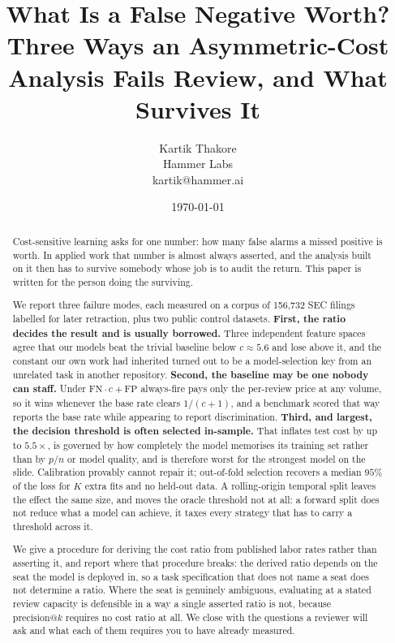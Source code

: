 \documentclass[11pt]{article}
\title{\bfseries What Is a False Negative Worth?\\[2pt]
\large Three Ways an Asymmetric-Cost Analysis Fails Review, and What Survives It}
\author{Kartik Thakore\\\small Hammer Labs\\\small kartik@hammer.ai}
\date{\today}
\begin{document}
\maketitle

\begin{abstract}
\noindent
Cost-sensitive learning asks for one number: how many false alarms a missed positive is worth.
In applied work that number is almost always asserted, and the analysis built on it then has to
survive somebody whose job is to audit the return. This paper is written for the person doing
the surviving.

We report three failure modes, each measured on a corpus of 156{,}732 SEC filings labelled for
later retraction, plus two public control datasets. \textbf{First, the ratio decides the
result and is usually borrowed.} Three independent feature spaces agree that our models beat
the trivial baseline below $c \approx 5.6$ and lose above it, and the constant our own work had
inherited turned out to be a model-selection key from an unrelated task in another repository.
\textbf{Second, the baseline may be one nobody can staff.} Under $\mathrm{FN}\cdot c + \mathrm{FP}$
always-fire pays only the per-review price at any volume, so it wins whenever the base rate
clears $1/(c+1)$, and a benchmark scored that way reports the base rate while appearing to
report discrimination. \textbf{Third, and largest, the decision threshold is often selected
in-sample.} That inflates test cost by up to $5.5\times$, is governed by how completely the
model memorises its training set rather than by $p/n$ or model quality, and is therefore worst
for the strongest model on the slide. Calibration provably cannot repair it; out-of-fold
selection recovers a median $95\%$ of the loss for $K$ extra fits and no held-out data. A
rolling-origin temporal split leaves the effect the same size, and moves the oracle threshold
not at all: a forward split does not reduce what a model can achieve, it taxes every strategy
that has to carry a threshold across it.

We give a procedure for deriving the cost ratio from published labor rates rather than
asserting it, and report where that procedure breaks: the derived ratio depends on the seat the
model is deployed in, so a task specification that does not name a seat does not determine a
ratio. Where the seat is genuinely ambiguous, evaluating at a stated review capacity is
defensible in a way a single asserted ratio is not, because $\mathrm{precision}@k$ requires no
cost ratio at all. We close with the questions a reviewer will ask and what each of them
requires you to have already measured.
\end{abstract}
\end{document}
